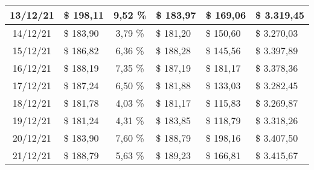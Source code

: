 \begin{center}
\begin{small}
\begin{longtable}{|c|l|c|l|l|l|}
13/12/21 & \$ 198,11 & 9,52 \% & \$ 183,97 & \$ 169,06 & \$ 3.319,45 \\ \hline
14/12/21 & \$ 183,90 & 3,79 \% & \$ 181,20 & \$ 150,60 & \$ 3.270,03 \\ \hline
15/12/21 & \$ 186,82 & 6,36 \% & \$ 188,28 & \$ 145,56 & \$ 3.397,89 \\ \hline
16/12/21 & \$ 188,19 & 7,35 \% & \$ 187,19 & \$ 181,17 & \$ 3.378,36 \\ \hline
17/12/21 & \$ 187,24 & 6,50 \% & \$ 181,88 & \$ 133,03 & \$ 3.282,45 \\ \hline
18/12/21 & \$ 181,78 & 4,03 \% & \$ 181,17 & \$ 115,83 & \$ 3.269,87 \\ \hline
19/12/21 & \$ 181,24 & 4,31 \% & \$ 183,85 & \$ 118,79 & \$ 3.318,26 \\ \hline
20/12/21 & \$ 183,90 & 7,60 \% & \$ 188,79 & \$ 198,16 & \$ 3.407,50 \\ \hline
21/12/21 & \$ 188,79 & 5,63 \% & \$ 189,23 & \$ 166,81 & \$ 3.415,67 \\ \hline
\end{longtable}
\end{small}
\end{center}